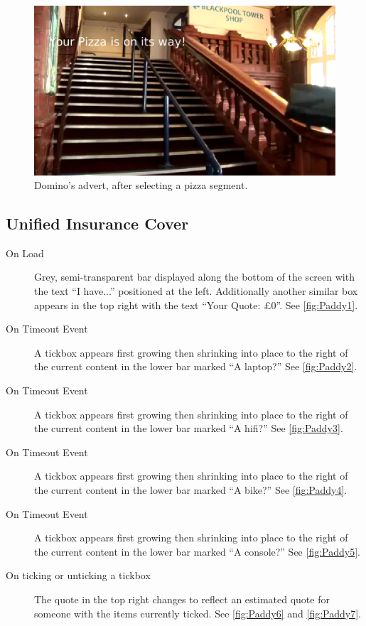 	\begin{figure}[th]
		\centering
		\includegraphics[width=\textwidth,height=0.5\textheight,keepaspectratio]{images/adverts/dominos-3.png}
		\caption{Domino's advert, after selecting a pizza segment.}
		\label{fig:Dominos3}
	\end{figure}
	
\subsection{Unified Insurance Cover}
	\begin{description}
		\item[On Load]{Grey, semi-transparent bar displayed along the bottom of the screen with the text ``I have...'' positioned at the left. Additionally another similar box appears in the top right with the text ``Your Quote: £0''. See \ref{fig:Paddy1}.}
		\item[On Timeout Event]{A tickbox appears first growing then shrinking into place to the right of the current content in the lower bar marked ``A laptop?'' See \ref{fig:Paddy2}.}
		\item[On Timeout Event]{A tickbox appears first growing then shrinking into place to the right of the current content in the lower bar marked ``A hifi?'' See \ref{fig:Paddy3}.}
		\item[On Timeout Event]{A tickbox appears first growing then shrinking into place to the right of the current content in the lower bar marked ``A bike?'' See \ref{fig:Paddy4}.}
		\item[On Timeout Event]{A tickbox appears first growing then shrinking into place to the right of the current content in the lower bar marked ``A console?'' See \ref{fig:Paddy5}.}
		\item[On ticking or unticking a tickbox]{The quote in the top right changes to reflect an estimated quote for someone with the items currently ticked. See \ref{fig:Paddy6} and \ref{fig:Paddy7}.}
	\end{description}
	
